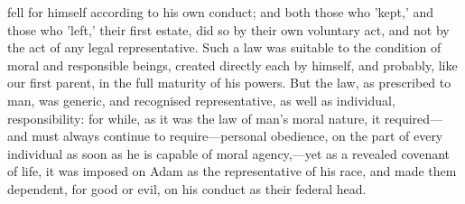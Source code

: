 \documentclass[
]{book}
\begin{document}
fell for himself according to his own conduct; and both those who 'kept,' and those who 'left,' their first estate, did so by their own voluntary act, and not by the act of any legal representative. Such a law was suitable to the condition of moral and responsible beings, created directly each by himself, and probably, like our first parent, in the full maturity of his powers. But the law, as prescribed to man, was generic, and recognised representative, as well as individual, responsibility: for while, as it was the law of man's moral nature, it required---and must always continue to require---personal obedience, on the part of every individual as soon as he is capable of moral agency,---yet as a revealed covenant of life, it was imposed on Adam as the representative of his race, and made them dependent, for good or evil, on his conduct as their federal head.
\end{document}
